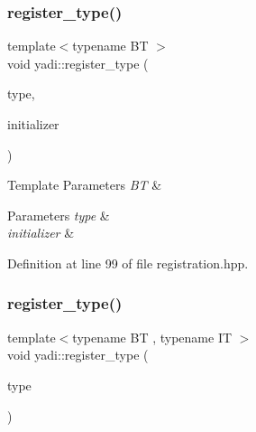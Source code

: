 \mbox{\label{namespaceyadi_acb78deb2170c9d148eee9194f632b03c}} 
\subsubsection{\texorpdfstring{register\+\_\+type()}{register\_type()}\hspace{0.1cm}{\footnotesize\ttfamily [2/3]}}
{\footnotesize\ttfamily template$<$typename BT $>$ \\
void yadi\+::register\+\_\+type (\begin{DoxyParamCaption}\item[{std\+::string}]{type,  }\item[{initializer\+\_\+type\+\_\+t$<$ BT $>$}]{initializer }\end{DoxyParamCaption})}


\begin{DoxyTemplParams}{Template Parameters}
{\em BT} & \\
\hline
\end{DoxyTemplParams}

\begin{DoxyParams}{Parameters}
{\em type} & \\
\hline
{\em initializer} & \\
\hline
\end{DoxyParams}


Definition at line 99 of file registration.\+hpp.

\mbox{\label{namespaceyadi_a5041a043acc0144113854035fb8beb2a}} 
\subsubsection{\texorpdfstring{register\+\_\+type()}{register\_type()}\hspace{0.1cm}{\footnotesize\ttfamily [3/3]}}
{\footnotesize\ttfamily template$<$typename BT , typename IT $>$ \\
void yadi\+::register\+\_\+type (\begin{DoxyParamCaption}\item[{std\+::string}]{type }\end{DoxyParamCaption})}




